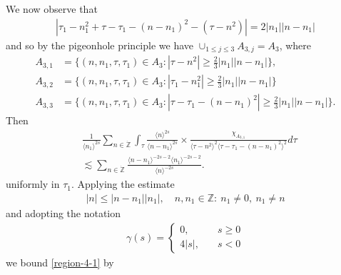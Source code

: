 \documentclass[12pt,reqno]{amsart}
\numberwithin{equation}{section}  %
\newcommand{\zz}{\mathbb{Z}}
\newcommand{\zzdot}{\dot{\zz}}
\begin{document}
We now observe that
%
%
\begin{equation*}
\begin{split}
  | \tau_{1} - n_{1}^{2} + \tau - \tau_{1} - (n - n_{1})^{2} - (\tau - n^{2}) | = 2| n_{1} || n - n_{1} |
\end{split}
\end{equation*}
%
%
and so by the pigeonhole principle we have $\cup_{1 \le j \le 3} A_{3,j} = A_{3}$, where 
\begin{align*}
  A_{3,1}&=\{(n, n_1, \tau, \tau_1)\in A_3: |\tau-n^{2}|\ge \frac{2}{3} |n_{1}|| n - n_{1} |\},\\
  A_{3,2}&=\{(n, n_1, \tau, \tau_1)\in A_3: |\tau_{1}-n_{1}^2|\ge \frac{2}{3} |n_{1}||n - n_{1}| \}\\
  A_{3,3}&=\{(n, n_1, \tau, \tau_1)\in A_3: |\tau - \tau_{1}-(n - n_{1})^2|\ge \frac{2}{3} |n_{1}||n - n_{1}| \}.
\end{align*} 
%
%
Then
%
%
%
%
%
%
%
%
%
%
%
%
%
%
\begin{equation}
  \label{region-4-1}
\begin{split}
  &  \frac{1}{\langle n_{1} \rangle ^{2s}
  } \sum_{n \in \zzdot} \int_{\tau} \frac{\langle n \rangle ^{2s}}{\langle
    n - n_{1}\rangle ^{2s}}  \times \frac{\chi_{A_{3,1}}}{\langle
  \tau - n^{2} \rangle^{2}  \langle \tau - \tau_{1} - (n - n_{1})^{2} \rangle^{2}} d \tau 
  \\
&  \lesssim \sum_{n \in \zzdot} \frac{\langle n - n_{1} \rangle ^{-2s-2} \langle n_{1} \rangle ^{-2s-2}}{\langle
    n\rangle ^{-2s}}.  
  \end{split}
\end{equation}
%
%
uniformly in $\tau_{1}$. Applying the estimate
  \begin{equation}
    \label{integer-bound}
  \begin{split}
    | n | \le | n - n_{1} | | n_{1} |, \quad n, n_{1} \in \zz: \ n_{1} \neq 0, \ n_{1} \neq n
  \end{split}
  \end{equation}
  and adopting the notation
  \begin{equation*}
  \begin{split}
  \gamma(s) = 
  \begin{cases} 0, \quad & s \ge 0
    \\
    4|s|, \quad & s < 0
  \end{cases}
\end{split}
  \end{equation*}
  we bound \eqref{region-4-1} by
\end{document}
